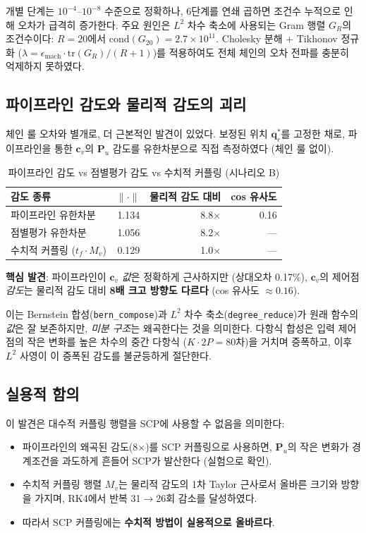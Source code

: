\documentclass[11pt]{article}
\begin{document}
개별 단계는 $10^{-4}$--$10^{-8}$ 수준으로 정확하나,
6단계를 연쇄 곱하면 조건수 누적으로 인해 오차가 급격히 증가한다.
주요 원인은 $L^2$ 차수 축소에 사용되는 Gram 행렬 $G_R$의 조건수이다:
$R=20$에서 $\mathrm{cond}(G_{20}) = 2.7 \times 10^{11}$.
Cholesky 분해 + Tikhonov 정규화 ($\lambda = \epsilon_{\mathrm{mach}} \cdot \mathrm{tr}(G_R)/(R+1)$)를
적용하여도 전체 체인의 오차 전파를 충분히 억제하지 못하였다.

\subsection{파이프라인 감도와 물리적 감도의 괴리}

체인 룰 오차와 별개로, 더 근본적인 발견이 있었다.
보정된 위치 $\mathbf{q}_r^*$를 고정한 채로,
파이프라인을 통한 $\mathbf{c}_v$의 $\mathbf{P}_u$ 감도를 유한차분으로
직접 측정하였다 (체인 룰 없이).

\begin{table}[h]
\centering
\caption{파이프라인 감도 vs 점별평가 감도 vs 수치적 커플링 (시나리오 B)}
\label{tab:sensitivity}
\begin{tabular}{lrrr}
\toprule
감도 종류 & $\|\cdot\|$ & 물리적 감도 대비 & cos 유사도 \\
\midrule
파이프라인 유한차분     & 1.134 & 8.8$\times$ & 0.16 \\
점별평가 유한차분       & 1.056 & 8.2$\times$ & --- \\
수치적 커플링 ($t_f \cdot M_v$) & 0.129 & 1.0$\times$ & --- \\
\bottomrule
\end{tabular}
\end{table}

\textbf{핵심 발견}: 파이프라인이 $\mathbf{c}_v$ \emph{값}은 정확하게 근사하지만
(상대오차 0.17\%), $\mathbf{c}_v$의 제어점 \emph{감도}는
물리적 감도 대비 \textbf{8배 크고 방향도 다르다} (cos 유사도 $\approx 0.16$).

이는 Bernstein 합성(\texttt{bern\_compose})과 $L^2$ 차수 축소(\texttt{degree\_reduce})가
원래 함수의 \emph{값}은 잘 보존하지만,
\emph{미분 구조}는 왜곡한다는 것을 의미한다.
다항식 합성은 입력 제어점의 작은 변화를 높은 차수의 중간 다항식
($K \cdot 2P = 80$차)을 거치며 증폭하고,
이후 $L^2$ 사영이 이 증폭된 감도를 불균등하게 절단한다.

\subsection{실용적 함의}

이 발견은 대수적 커플링 행렬을 SCP에 사용할 수 없음을 의미한다:
\begin{itemize}
  \item 파이프라인의 왜곡된 감도(8$\times$)를 SCP 커플링으로 사용하면,
        $\mathbf{P}_u$의 작은 변화가 경계조건을 과도하게 흔들어
        SCP가 발산한다 (실험으로 확인).
  \item 수치적 커플링 행렬 $M_v$는 물리적 감도의
        1차 Taylor 근사로서 올바른 크기와 방향을 가지며,
        RK4에서 반복 31$\to$26회 감소를 달성하였다\cite{report011}.
  \item 따라서 SCP 커플링에는 \textbf{수치적 방법이 실용적으로 올바르다}.
\end{itemize}
\end{document}
